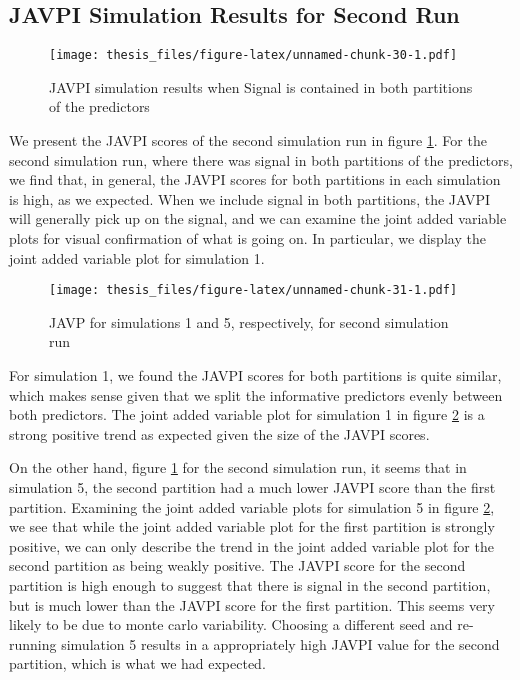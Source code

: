 \documentclass[12pt,twoside]{reedthesis}
\theoremstyle{definition}
\theoremstyle{definition}
\theoremstyle{definition}
\theoremstyle{remark}
\begin{document}
\subsection{JAVPI Simulation Results for Second
Run}\label{javpi-simulation-results-for-second-run}
\begin{figure}
\centering
\texttt{[image: thesis\_files/figure-latex/unnamed-chunk-30-1.pdf]}
\caption{\label{fig:unnamed-chunk-30}\label{JAVPItwosig}JAVPI simulation
results when Signal is contained in both partitions of the predictors}
\end{figure}
We present the JAVPI scores of the second simulation run in figure
\ref{JAVPItwosig}. For the second simulation run, where there was signal
in both partitions of the predictors, we find that, in general, the
JAVPI scores for both partitions in each simulation is high, as we
expected. When we include signal in both partitions, the JAVPI will
generally pick up on the signal, and we can examine the joint added
variable plots for visual confirmation of what is going on. In
particular, we display the joint added variable plot for simulation 1.
\par 
\begin{figure}
\centering
\texttt{[image: thesis\_files/figure-latex/unnamed-chunk-31-1.pdf]}
\caption{\label{fig:unnamed-chunk-31}\label{siml1and5plots}JAVP for
simulations 1 and 5, respectively, for second simulation run}
\end{figure}
For simulation 1, we found the JAVPI scores for both partitions is quite
similar, which makes sense given that we split the informative
predictors evenly between both predictors. The joint added variable plot
for simulation 1 in figure \ref{siml1and5plots} is a strong positive
trend as expected given the size of the JAVPI scores. \par 

On the other hand, figure \ref{JAVPItwosig} for the second simulation
run, it seems that in simulation 5, the second partition had a much
lower JAVPI score than the first partition. Examining the joint added
variable plots for simulation 5 in figure \ref{siml1and5plots}, we see
that while the joint added variable plot for the first partition is
strongly positive, we can only describe the trend in the joint added
variable plot for the second partition as being weakly positive. The
JAVPI score for the second partition is high enough to suggest that
there is signal in the second partition, but is much lower than the
JAVPI score for the first partition. This seems very likely to be due to
monte carlo variability. Choosing a different seed and re-running
simulation 5 results in a appropriately high JAVPI value for the second
partition, which is what we had expected. \par 
\end{document}
